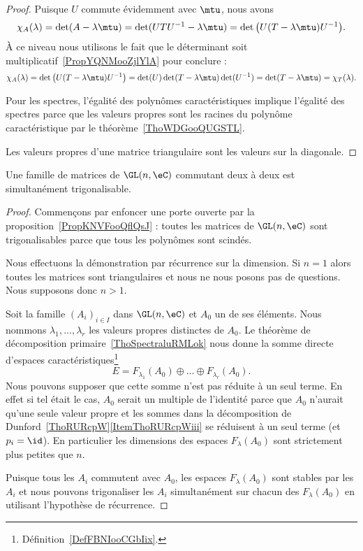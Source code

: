 \begin{proof}
	Puisque \( U\) commute évidemment avec \( \mtu\), nous avons
	\begin{equation}
		\chi_A(\lambda)=\det(A-\lambda \mtu)=\det(UTU^{-1}-\lambda\mtu)=\det\big( U(T-\lambda\mtu)U^{-1} \big).
	\end{equation}
	À ce niveau nous utilisons le fait que le déterminant soit multiplicatif~\ref{PropYQNMooZjlYlA} pour conclure :
	\begin{equation}
		\chi_A(\lambda)=\det\big( U(T-\lambda\mtu)U^{-1} \big)=\det(U)\det(T-\lambda\mtu)\det(U^{-1})=\det(T-\lambda\mtu)=\chi_T(\lambda).
	\end{equation}

	Pour les spectres, l'égalité des polynômes caractéristiques implique l'égalité des spectres parce que les valeurs propres sont les racines du polynôme caractéristique par le théorème~\ref{ThoWDGooQUGSTL}.

	Les valeurs propres d'une matrice triangulaire sont les valeurs sur la diagonale.
\end{proof}

\begin{lemma}   \label{LemSLGPooIghEPI}
	Une famille de matrices de \( \GL(n,\eC)\) commutant deux à deux est simultanément trigonalisable.
\end{lemma}

\begin{proof}
	Commençons par enfoncer une porte ouverte par la proposition~\ref{PropKNVFooQflQsJ} : toutes les matrices de \( \GL(n,\eC)\) sont trigonalisables parce que tous les polynômes sont scindés.

	Nous effectuons la démonstration par récurrence sur la dimension. Si \( n=1\) alors toutes les matrices sont triangulaires et nous ne nous posons pas de questions. Nous supposons donc \( n>1\).

	Soit la famille \( (A_i)_{i\in I}\) dans \( \GL(n,\eC)\) et \( A_0\) un de ses éléments. Nous nommons \( \lambda_1,\ldots, \lambda_r\) les valeurs propres distinctes de \( A_0\). Le théorème de décomposition primaire~\ref{ThoSpectraluRMLok} nous donne la somme directe d'espaces caractéristiques\footnote{Définition~\ref{DefFBNIooCGbIix}.}
	\begin{equation}
		E=F_{\lambda_1}(A_0)\oplus\ldots\oplus F_{\lambda_r}(A_0).
	\end{equation}
	Nous pouvons supposer que cette somme n'est pas réduite à un seul terme. En effet si tel était le cas, \( A_0\) serait un multiple de l'identité parce que \( A_0\) n'aurait qu'une seule valeur propre et les sommes dans la décomposition de Dunford~\ref{ThoRURcpW}\ref{ItemThoRURcpWiii} se réduisent à un seul terme (et \( p_i=\id\)). En particulier les dimensions des espaces \( F_{\lambda}(A_0)\) sont strictement plus petites que \( n\).

	Puisque tous les \( A_i\) commutent avec \( A_0\), les espaces \( F_{\lambda}(A_0)\) sont stables par les \( A_i\) et nous pouvons trigonaliser les \( A_i\) simultanément sur chacun des \( F_{\lambda}(A_0)\) en utilisant l'hypothèse de récurrence.
\end{proof}

